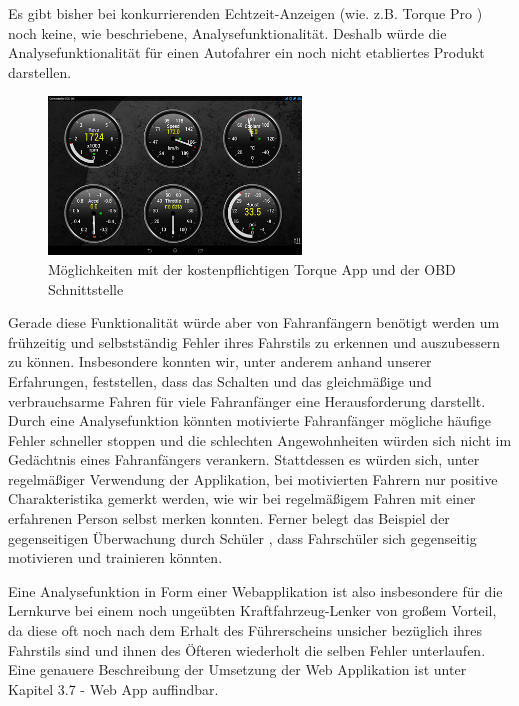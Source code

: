 Es gibt bisher bei konkurrierenden Echtzeit-Anzeigen (wie. z.B. Torque Pro \cite{SIMR.CH1-Fahrstil-Analyse.TorquePro}) noch keine, wie beschriebene, Analysefunktionalität. Deshalb würde die Analysefunktionalität für einen Autofahrer ein noch nicht etabliertes Produkt darstellen.

\begin{figure}[!htb]\centering
	\includegraphics[width=0.6\textwidth]{images/torquePro}
	\caption{Möglichkeiten mit der kostenpflichtigen Torque App  und der OBD Schnittstelle \cite{SIMR.CH1-Fahrstil-Analyse.TorquePro}}\label{Fig:imgGTR}
\end{figure}

Gerade diese Funktionalität würde aber von Fahranfängern benötigt werden um frühzeitig und selbstständig Fehler ihres Fahrstils zu erkennen und auszubessern zu können. Insbesondere konnten wir, unter anderem anhand unserer Erfahrungen, feststellen, dass das Schalten und das gleichmäßige und verbrauchsarme Fahren für viele Fahranfänger eine Herausforderung darstellt. Durch eine Analysefunktion könnten motivierte Fahranfänger mögliche häufige Fehler schneller stoppen und die schlechten Angewohnheiten würden sich nicht im  Gedächtnis eines Fahranfängers verankern. Stattdessen es würden sich, unter regelmäßiger Verwendung der Applikation, bei motivierten Fahrern nur positive Charakteristika gemerkt werden, wie wir bei regelmäßigem Fahren mit einer erfahrenen Person selbst merken konnten. Ferner belegt das Beispiel der gegenseitigen Überwachung durch Schüler \cite{SIMR.CH1-fahrstil-analyse.PeerPressure}, dass Fahrschüler sich gegenseitig motivieren und trainieren könnten.

Eine Analysefunktion in Form einer Webapplikation ist also insbesondere für die Lernkurve bei einem noch ungeübten Kraftfahrzeug-Lenker von großem Vorteil, da diese oft noch nach dem Erhalt des Führerscheins unsicher bezüglich ihres Fahrstils sind und ihnen des Öfteren wiederholt die selben Fehler unterlaufen. Eine genauere Beschreibung der Umsetzung der Web Applikation ist unter Kapitel 3.7 - Web App auffindbar.

\clearpage %
